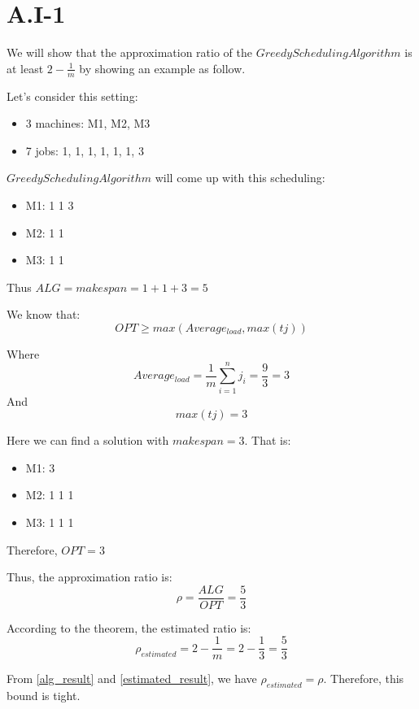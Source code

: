 \section*{A.I-1}
\label{a-1-1)}

We will show that the approximation ratio of the $GreedySchedulingAlgorithm$ is at least $2 - \frac{1}{m}$ by showing an example as follow.

Let's consider this setting:

\begin{itemize}
    \item 3 machines: M1, M2, M3
    \item 7 jobs: 1, 1, 1, 1, 1, 1, 3
  \end{itemize}

$Greedy Scheduling Algorithm$ will come up with this scheduling:

\begin{itemize}
\item M1: 1 1 3
\item M2: 1 1
\item M3: 1 1
\end{itemize}

Thus $ALG = makespan = 1 + 1 + 3 = 5$

We know that:
\begin{equation}
 OPT \geq max(Average_{load}, max(tj))
\end{equation}

Where $$Average_{load} = \frac{1}{m} \sum_{i=1}^{n} j_i = \frac{9}{3} = 3$$
And $$max(tj) = 3$$

Here we can find a solution with $makespan = 3$. That is:
\begin{itemize}
\item M1: 3
\item M2: 1 1 1
\item M3: 1 1 1
\end{itemize}

Therefore, $OPT = 3$

Thus, the approximation ratio is:
\begin{equation}
  \label{alg_result}
  \rho = \frac{ALG}{OPT} = \frac{5}{3} 
\end{equation}

According to the theorem, the estimated ratio is:
\begin{equation}
  \label{estimated_result}
  \rho_{estimated} = 2 - \frac{1}{m} = 2 - \frac{1}{3} = \frac{5}{3}
\end{equation}

From \ref{alg_result} and \ref{estimated_result}, we have $\rho_{estimated} = \rho$. Therefore, this bound is tight.
